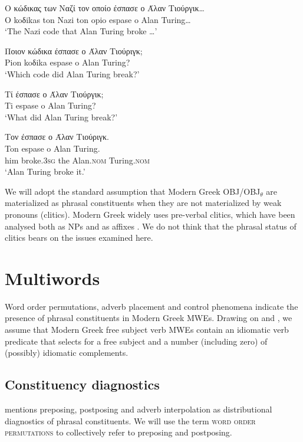 \documentclass[output=paper]{langsci/langscibook}
\begin{document}
\ea
\label{ex:7:9}
\gll Ο κώδικας των Ναζί τον οποίο έσπασε ο Άλαν Τιούργικ\ldots \\
O koδikas ton Nazi ton opio espase o Alan Turing\ldots\\
\glt `The Nazi code that Alan Turing broke \ldots'
\z

\ea%
    \label{ex:7:10}
\gll Ποιον κώδικα έσπασε ο Άλαν Τιούριγκ;\\
Pion koδika espase o Alan Turing?\\
\glt `Which code did Alan Turing break?'
\z

\ea%
\label{ex:7:11}
\gll  Τί έσπασε ο Άλαν Τιούργικ;\\
Ti espase o Alan Turing?\\
\glt `What did Alan Turing break?'
\z

\ea%
    \label{ex:7:12}
\glll Τον έσπασε ο Άλαν Τιούριγκ.\\
Ton espase o Alan Turing.\\
     him broke.\textsc{3sg} the Alan.\textsc{nom} Turing.\textsc{nom}\\
\glt `Alan Turing broke it.'
\z

We will adopt the standard assumption that Modern Greek OBJ/OBJ$_\theta$  are materialized as phrasal constituents when they are not materialized by weak pronouns (clitics). Modern Greek widely uses pre-verbal clitics, which have been analysed both as NPs and as affixes \citep{joseph89}. We do not think that the phrasal status of clitics bears on the issues examined here.
 
\section{Multiwords}
\label{sec:mark:2}

Word order permutations, adverb placement and control phenomena indicate the presence of phrasal constituents in Modern Greek  MWEs. Drawing on \citet{kaysagidioms} and \cite{Samaridi:Markantonatou:14}, we assume that Modern Greek free subject verb MWEs contain an idiomatic verb predicate that selects for a free subject and a number (including zero) of (possibly) idiomatic complements. 

\subsection{Constituency diagnostics}

\citet{radford1988} mentions preposing, postposing and adverb interpolation as distributional diagnostics of phrasal constituents. We will use the term \textsc{word order permutations} to collectively refer to preposing and postposing. 
\end{document}
